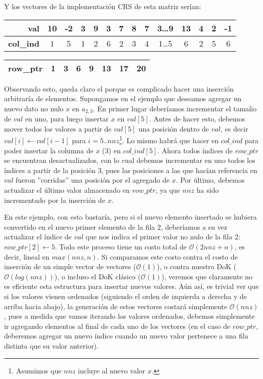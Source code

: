 \par Y los vectores de la implementaci\'on CRS de esta matriz ser\'ian:

\begin{table}[!h]
    \begin{tabular}{|r|c|c|c|c|c|c|c|c|c|c|c|c|c|}
        \hline
        \textbf{val}&10&-2&3&9&3&7&8&7&3\dots 9&13&4&2&-1\\
        \hline
        \textbf{col\_ind}&1&5&1&2&6&2&3&4&1\dots 5&6&2&5&6\\
        \hline
    \end{tabular}
    \begin{tabular}{|r|c|c|c|c|c|c|c|}
        \hline
        \textbf{row\_ptr}&1&3&6&9&13&17&20\\
        \hline
    \end{tabular}
\end{table}
\medskip

\par Observando esto, queda claro el porque es complicado hacer una inserci\'on
arbitrar\'ia de elementos. Supongamos en el ejemplo que deseamos agregar un
nuevo dato no nulo $x$ en $a_{2,3}$. En primer lugar deber\'iamos incrementar el
tama\~no de $val$ en uno, para luego insertar $x$ en $val[5]$. Antes de hacer
esto, debemos mover todos los valores a partir de $val[5]$ una posici\'on dentro
de $val$, es decir $val[i]\gets val[i-1]$ para $i=5..nnz$\footnote{Asumimos que
$nnz$ incluye al nuevo valor $x$.}. Lo mismo habr\'a que hacer en $col\_ind$
para poder insertar la columna de $x$ (3) en $col\_ind[5]$. Ahora todos
\'indices de $row\_ptr$ se encuentran desactualizados, con lo cual debemos
incrementar en uno todos los \'indices a partir de la posici\'on 3, pues las
posiciones a las que hac\'ian referencia en $val$ fueron ''corridas'' una
posici\'on por el agregado de $x$.  Por \'ultimo, debemos actualizar el \'ultimo
valor almacenado en $row\_ptr$, ya que $nnz$ ha sido incrementado por la
inserci\'on de $x$.

\par En este ejemplo, con esto bastar\'ia, pero si el nuevo elemento insertado
se hubiera convertido en el nuevo primer elemento de la fila $2$, deber\'iamos a
su vez actualizar el \'indice de $val$ que nos indica el primer valor no nulo de
la fila $2$: $row\_ptr[2] \gets 5$. Todo este proceso tiene un costo total de
$\mathcal{O}(2nnz+n)$, es decir, lineal en $max(nnz,n)$. Si comparamos este
costo contra el costo de inserci\'on de un simple vector de vectores
($\mathcal{O}(1)$), o contra nuestro DoK ($\mathcal{O}(log(nnz))$), o incluso el
DoK cl\'asico ($\mathcal{O}(1)$), veremos que claramente no es eficiente esta
estructura para insertar nuevos valores. A\'un as\'i, es trivial ver que si los
valores vienen ordenados (siguiendo el orden de izquierda a derecha y de arriba
hacia abajo), la generaci\'on de estos vectores costar\'a simplemente
$\mathcal{O}(nnz)$, pues a medida que vamos iterando los valores ordenados,
debemos simplemente ir agregando elementos al final de cada uno de los vectores
(en el caso de $row\_ptr$, deberemos agregar un nuevo \'indice cuando un nuevo
valor pertenece a una fila distinta que su valor anterior).

